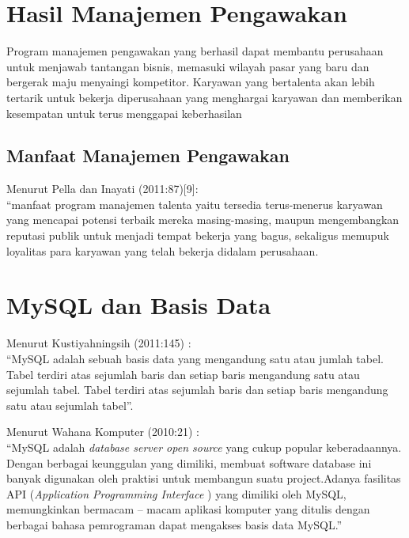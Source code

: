 \section{Hasil Manajemen Pengawakan}

Program manajemen pengawakan yang berhasil dapat membantu perusahaan untuk menjawab tantangan bisnis, memasuki wilayah pasar yang baru dan bergerak maju menyaingi kompetitor. Karyawan yang bertalenta akan lebih tertarik untuk bekerja diperusahaan yang menghargai karyawan dan memberikan kesempatan untuk terus menggapai keberhasilan

\subsection{Manfaat Manajemen Pengawakan}

Menurut Pella dan Inayati (2011:87)[9]: \\
“manfaat program manajemen talenta yaitu tersedia terus-menerus karyawan yang mencapai potensi terbaik mereka masing-masing, maupun mengembangkan reputasi publik untuk menjadi tempat bekerja yang bagus, sekaligus memupuk loyalitas para karyawan yang telah bekerja didalam perusahaan.


\section{MySQL dan Basis Data}

Menurut Kustiyahningsih (2011:145) : \\
“MySQL adalah sebuah basis data yang mengandung satu atau jumlah tabel. Tabel terdiri atas sejumlah baris dan setiap baris mengandung satu atau sejumlah tabel. Tabel terdiri atas sejumlah baris dan setiap baris mengandung satu atau sejumlah tabel”. 

Menurut Wahana Komputer (2010:21) : \\
“MySQL adalah \textit{database server open source} yang cukup popular keberadaannya. Dengan berbagai keunggulan yang dimiliki, membuat software database ini banyak digunakan oleh praktisi untuk membangun suatu project.Adanya fasilitas API (\textit{Application Programming Interface} ) yang dimiliki oleh MySQL, memungkinkan bermacam – macam aplikasi komputer yang ditulis dengan berbagai bahasa pemrograman dapat mengakses basis data MySQL.” \\

